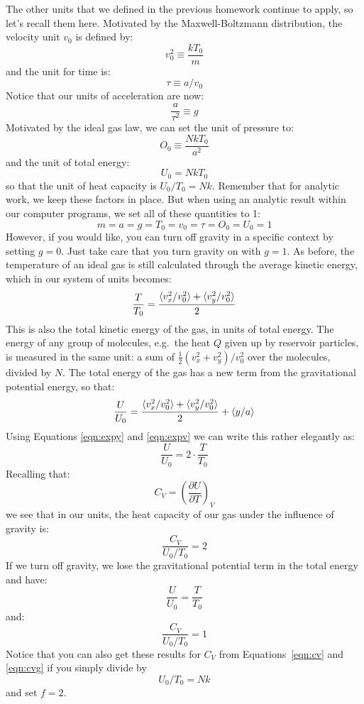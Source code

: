 \documentclass[12pt]{article}
\begin{document}
The other units that we defined in the previous homework continue to
apply, so let's recall them here.  Motivated by the Maxwell-Boltzmann
distribution, the velocity unit
$v_0$ is defined by:
$$ v_0^2 \equiv \frac{k T_0}{m}$$
and the unit for time is:
$$ \tau \equiv a / v_0$$
Notice that our units of acceleration are now:
$$\frac{a}{\tau^2} \equiv g$$
Motivated by the ideal gas law, we can set the unit of pressure to:
$$O_0 \equiv \frac{NkT_0}{a^2}$$
and the unit of total energy:
$$U_0 = N k T_0$$
so that the unit of heat capacity is $U_0/T_0 = Nk$.
Remember that for analytic work, we keep these factors in place.  But when using an
analytic result within our computer programs, we set all of these quantities to 1:
$$m = a = g = T_0 = v_0 = \tau = O_0 = U_0 = 1$$
However, if you would like, you can turn off gravity in a specific
context by setting $g=0$. Just take care that you turn gravity on with $g=1$.
As before, the temperature of an ideal gas is still calculated through
the average kinetic energy, which in our system of units becomes:
\begin{equation}
 \label{eqn:expv}
  \frac{T}{T_0} = \frac{\braket{v_x^2/v_0^2} + \braket{v_y^2/v_0^2}}{2}
\end{equation}
This is also the total kinetic energy of the gas, in units of total energy.
The energy of any group of molecules, e.g.\ the heat $Q$ given up by
reservoir particles, is measured in the same unit: a sum of
$\frac{1}{2}(v_x^2 + v_y^2)/v_0^2$ over the molecules, divided by $N$.
The total energy of the gas has a new term from the gravitational potential energy, so that:
\begin{equation}
  \frac{U}{U_0} = \frac{\braket{v_x^2/v_0^2} + \braket{v_y^2/v_0^2}}{2} + \braket{y/a}
\end{equation}
Using Equations \ref{eqn:expy} and \ref{eqn:expv} we can write this rather elegantly as:
\begin{equation}
  \frac{U}{U_0} = 2 \cdot \frac{T}{T_0}
\end{equation}
Recalling that:
$$C_V = \left( \frac{\partial U}{\partial T}\right)_V$$
we see that in our units, the heat capacity of our gas under the influence of gravity is:
\begin{equation}
\frac{C_V}{U_0 / T_0} = 2
\end{equation}
If we turn off gravity, we lose the gravitational potential term in the total energy and have:
\begin{equation}
  \frac{U}{U_0} = \frac{T}{T_0}
\end{equation}
and:
\begin{equation}
\frac{C_V}{U_0 / T_0} = 1
\end{equation}
Notice that you can also get these results for $C_V$ from Equations~\ref{eqn:cv} and
\ref{eqn:cvg} if you simply divide by
$$U_0/T_0 = N k$$
and set $f=2$.
\end{document}

